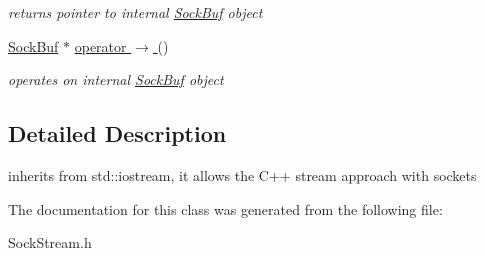 \begin{CompactItemize}
\begin{CompactList}\small\item\em returns pointer to internal \hyperlink{classsocketpp_1_1SockBuf}{SockBuf} object \item\end{CompactList}\item 
\hypertarget{classsocketpp_1_1SockStream_c5509fd039943c07c4506e42c75605e3}{
\hyperlink{classsocketpp_1_1SockBuf}{SockBuf} $\ast$ \hyperlink{classsocketpp_1_1SockStream_c5509fd039943c07c4506e42c75605e3}{operator $\rightarrow$ } ()}
\label{classsocketpp_1_1SockStream_c5509fd039943c07c4506e42c75605e3}

\begin{CompactList}\small\item\em operates on internal \hyperlink{classsocketpp_1_1SockBuf}{SockBuf} object \item\end{CompactList}\end{CompactItemize}


\subsection{Detailed Description}
inherits from std::iostream, it allows the C++ stream approach with sockets 

The documentation for this class was generated from the following file:\begin{CompactItemize}
\item 
SockStream.h\end{CompactItemize}
